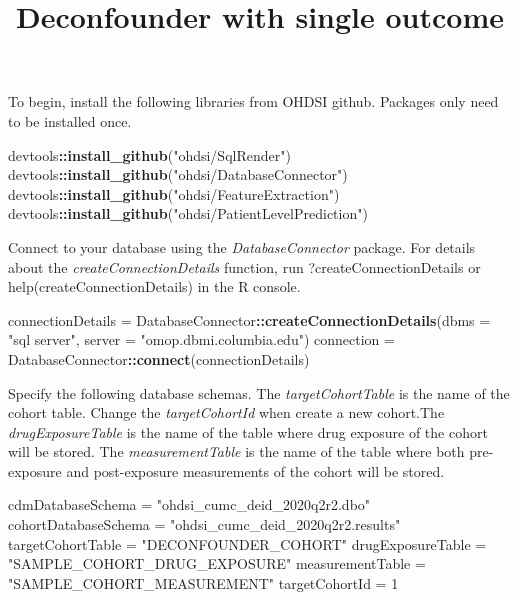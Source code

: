 \documentclass[]{article}
\title{Deconfounder with single outcome}
\author{}
\date{}
\newenvironment{Shaded}{\begin{snugshade}}{\end{snugshade}}
\newcommand{\DataTypeTok}[1]{\textcolor[rgb]{0.13,0.29,0.53}{#1}}
\newcommand{\DecValTok}[1]{\textcolor[rgb]{0.00,0.00,0.81}{#1}}
\newcommand{\KeywordTok}[1]{\textcolor[rgb]{0.13,0.29,0.53}{\textbf{#1}}}
\newcommand{\NormalTok}[1]{#1}
\newcommand{\OperatorTok}[1]{\textcolor[rgb]{0.81,0.36,0.00}{\textbf{#1}}}
\newcommand{\StringTok}[1]{\textcolor[rgb]{0.31,0.60,0.02}{#1}}
\begin{document}
\maketitle

{
\setcounter{tocdepth}{2}
\tableofcontents
}
To begin, install the following libraries from OHDSI github. Packages
only need to be installed once.

\begin{Shaded}
\begin{Highlighting}[]
\NormalTok{devtools}\OperatorTok{::}\KeywordTok{install\_github}\NormalTok{(}\StringTok{"ohdsi/SqlRender"}\NormalTok{)}
\NormalTok{devtools}\OperatorTok{::}\KeywordTok{install\_github}\NormalTok{(}\StringTok{"ohdsi/DatabaseConnector"}\NormalTok{)}
\NormalTok{devtools}\OperatorTok{::}\KeywordTok{install\_github}\NormalTok{(}\StringTok{"ohdsi/FeatureExtraction"}\NormalTok{)}
\NormalTok{devtools}\OperatorTok{::}\KeywordTok{install\_github}\NormalTok{(}\StringTok{"ohdsi/PatientLevelPrediction"}\NormalTok{)}
\end{Highlighting}
\end{Shaded}

Connect to your database using the \emph{DatabaseConnector} package. For
details about the \emph{createConnectionDetails} function, run
?createConnectionDetails or help(createConnectionDetails) in the R
console.

\begin{Shaded}
\begin{Highlighting}[]
\NormalTok{connectionDetails =}\StringTok{ }\NormalTok{DatabaseConnector}\OperatorTok{::}\KeywordTok{createConnectionDetails}\NormalTok{(}\DataTypeTok{dbms =} \StringTok{"sql server"}\NormalTok{,}
                                             \DataTypeTok{server =} \StringTok{"omop.dbmi.columbia.edu"}\NormalTok{)}
\NormalTok{connection =}\StringTok{ }\NormalTok{DatabaseConnector}\OperatorTok{::}\KeywordTok{connect}\NormalTok{(connectionDetails)}
\end{Highlighting}
\end{Shaded}

Specify the following database schemas. The \emph{targetCohortTable} is
the name of the cohort table. Change the \emph{targetCohortId} when
create a new cohort.The \emph{drugExposureTable} is the name of the
table where drug exposure of the cohort will be stored. The
\emph{measurementTable} is the name of the table where both pre-exposure
and post-exposure measurements of the cohort will be stored.

\begin{Shaded}
\begin{Highlighting}[]
\NormalTok{cdmDatabaseSchema =}\StringTok{ "ohdsi\_cumc\_deid\_2020q2r2.dbo"}
\NormalTok{cohortDatabaseSchema =}\StringTok{ "ohdsi\_cumc\_deid\_2020q2r2.results"}
\NormalTok{targetCohortTable =}\StringTok{ "DECONFOUNDER\_COHORT"}
\NormalTok{drugExposureTable =}\StringTok{ "SAMPLE\_COHORT\_DRUG\_EXPOSURE"}
\NormalTok{measurementTable =}\StringTok{ "SAMPLE\_COHORT\_MEASUREMENT"}
\NormalTok{targetCohortId =}\StringTok{ }\DecValTok{1}
\end{Highlighting}
\end{Shaded}
\end{document}
